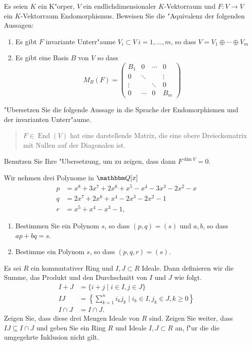 \documentclass[a4,11pt]{article}
\DeclareMathOperator{\End}{End}
\begin{document}
\begin{aufgabe}
Es seien $K$ ein K"orper, $V$ ein endlichdimensionaler $K$-Vektorraum und $F : V \rightarrow V$ ein $K$-Vektorraum Endomorphismus. Beweisen Sie die "Aquivalenz der folgenden Aussagen:


\begin{enumerate}
\item Es gibt $F$ invariante Unterr"aume $V_i \subset V \ i= 1,\dots , m$, so dass $V = V_1 \oplus \cdots \oplus V_m$
\item Es gibt eine Basis $B$ von $V$ so dass 
\[
M_B(F) = \begin{pmatrix}B_1 & 0 & \cdots& 0\\
0& \ddots & & \vdots \\
\vdots & & \ddots& 0 \\
0 & \cdots & 0 & B_m
\end{pmatrix}
\]
\end{enumerate}
\end{aufgabe}

\begin{aufgabe}
  "Ubersetzen Sie die folgende Aussage in die Sprache der
  Endomorphismen und der invarianten Unterr"aume.
  \begin{quotation}
    $F \in \End(V)$ hat eine darstellende Matrix, die eine obere
    Dreiecksmatrix mit Nullen auf der Diagonalen ist.
  \end{quotation}

  Benutzen Sie Ihre "Ubersetzung, um zu zeigen, dass dann $F^{\dim V}
  = 0$.
\end{aufgabe}

\begin{aufgabe}
Wir nehmen drei Polynome in $\Q[x]$
\begin{align*}
p &= x^8 + 3x^7 + 2x^6 + x^5 - x^4 - 3x^3 - 2x^2 - x\\
q &= 2x^7 + 2x^6 + x^4 - 2x^3 - 2x^2 - 1\\
r &= x^5 + x^4 - x^3 - 1,
\end{align*}
\begin{enumerate}
\item
  Bestimmen Sie ein Polynom $s$, so dass $(p,q) = (s)$
  und $a,b$, so dass $ap+bq=s$.
\item
  Bestimme ein Polynom $s$, so dass $(p,q,r) = (s)$.
 \end{enumerate}
\end{aufgabe}

\begin{aufgabe}

Es sei $R$ ein kommutativer Ring und $I, J \subset R$ Ideale. Dann
definieren wir die Summe, das Produkt und den Durchschnitt von $I$ und
$J$ wie folgt.
\begin{align*}
I + J &= \{ i + j \mid i \in I, j \in J \}\\
IJ &= \left\{ \sum_{k = 1}^n i_k j_k \mid i_k \in I, j_k \in J, k \geq 0 \right\}\\
I \cap J &= I \cap J.
\end{align*}
Zeigen Sie, dass diese drei Mengen Ideale von $R$ sind. Zeigen Sie
weiter, dass $IJ \subseteq I \cap J$ und geben Sie ein Ring $R$ und
Ideale $I, J \subset R$ an, f"ur die die umgegehrte Inklusion nicht gilt.  
\end{aufgabe}
\end{document}
